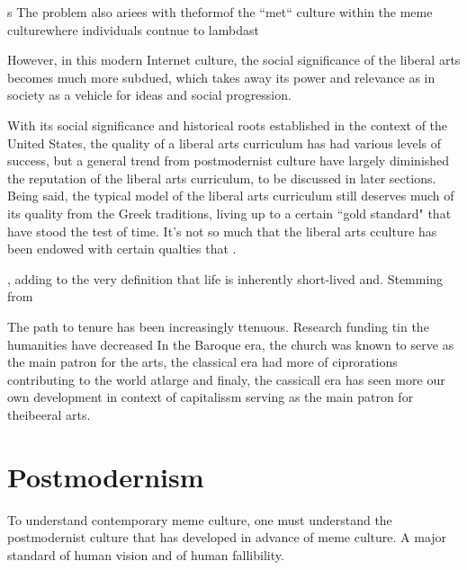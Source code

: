 \documentclass[12pt,letterpaper]{article}
\begin{document}
s
The problem also ariees with theformof the ``met`` culture within  the meme culturewhere individuals contnue to lambdast 

However, in this modern Internet culture, the social significance of the liberal arts becomes much more subdued, which takes away its power and relevance as in society as a vehicle for ideas and social progression.

With  its social significance and historical roots established in the context of the United States, the quality of a liberal arts curriculum has had various levels of success, but a general trend from postmodernist culture have largely diminished the reputation of the liberal arts curriculum, to be discussed in later sections.  Being said, the typical model of the liberal arts curriculum still deserves much of its quality from the Greek traditions, living up to a certain ``gold standard" that have stood the test of time.  It's not so much that the liberal arts cculture has been endowed with certain qualties that .

, adding to the very definition that life is inherently short-lived and.  Stemming from 

The path to tenure has been increasingly ttenuous.  Research funding tin the humanities have decreased In the Baroque era, the church was known to serve as the main patron for the arts, the classical era had more of ciprorations contributing to the world atlarge and finaly, the cassicall era has seen more our own development in context of capitalissm serving as the main patron for theibeeral arts.


\section{Postmodernism}

To understand contemporary meme culture, one must understand the postmodernist culture that has developed in advance of meme culture.  A major standard of human vision and of human fallibility.  
\end{document}
